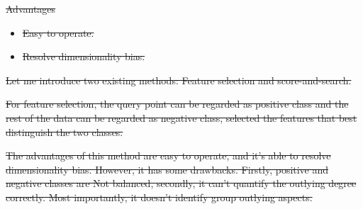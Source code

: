 \documentclass[
 size=14pt,
 paper=smartboard,  %
 mode=present, 		%
 display=slides, 	%
 style=tuliplab,  	%
 pauseslide,
 fleqn,leqno]{powerdot}
\providecommand{\DIFdeltex}[1]{{\protect\color{red}\sout{#1}}}                      %
\providecommand{\DIFdel}[1]{\texorpdfstring{\DIFdeltex{#1}}{}} %
\begin{document}
\DIFdel{Advantages
}%
\begin{itemize}%
\item%
\DIFdel{Easy to operate.}%

\item%
\DIFdel{Resolve dimensionality bias.
}
\end{itemize}%

\DIFdel{Let me introduce two existing methods:
Feature selection and score-and-search.
}%

\DIFdel{For feature selection,
the query point can be regarded as positive class and
the rest of the data can be regarded as negative class,
selected the features that best distinguish the two classes.
}%

\DIFdel{The advantages of this method are easy to operate,
and it's able to resolve dimensionality bias.
However, it has some drawbacks.
Firstly,
positive and negative classes are Not balanced,
secondly,
it can't quantify the outlying degree correctly.
Most importantly,
it doesn't identify group outlying aspects.
}%
\end{document}
